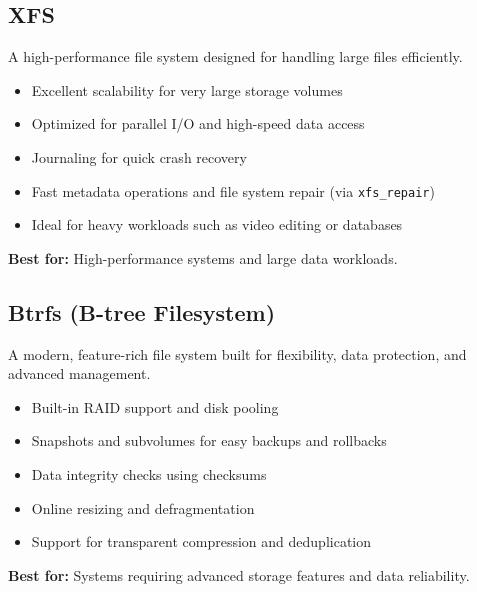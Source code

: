 \subsection{XFS}
A high-performance file system designed for handling large files efficiently.
\begin{itemize}
    \item Excellent scalability for very large storage volumes
    \item Optimized for parallel I/O and high-speed data access
    \item Journaling for quick crash recovery
    \item Fast metadata operations and file system repair (via \texttt{xfs\_repair})
    \item Ideal for heavy workloads such as video editing or databases
\end{itemize}
\textbf{Best for:} High-performance systems and large data workloads.

\subsection{Btrfs (B-tree Filesystem)}
A modern, feature-rich file system built for flexibility, data protection, and advanced management.
\begin{itemize}
    \item Built-in RAID support and disk pooling
    \item Snapshots and subvolumes for easy backups and rollbacks
    \item Data integrity checks using checksums
    \item Online resizing and defragmentation
    \item Support for transparent compression and deduplication
\end{itemize}
\textbf{Best for:} Systems requiring advanced storage features and data reliability.

